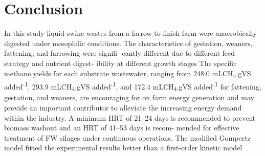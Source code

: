 \section{Conclusion}
In this study liquid swine wastes from a farrow to finish farm were anaerobically digested under mesophilic conditions. The characteristics of gestation, weaners, fattening, and farrowing were signifi-
cantly different due to different feed strategy and nutrient digest- ibility at different growth stages The specific methane yields for each substrate wastewater, ranging from 248.0 mLCH\textsubscript{4}.gVS added\textsuperscript{-1}, 293.9 mLCH\textsubscript{4}.gVS added\textsuperscript{-1}, and 172.4 mLCH\textsubscript{4}.gVS added\textsuperscript{-1} for fattening, gestation, and weaners, are encouraging for on farm energy generation and may provide an important contributor to alleviate the increasing energy demand within the industry. A minimum HRT of 21–24 days is recommended to prevent biomass washout and an HRT of 41–53 days is recom- mended for effective treatment of FW silages under continuous operations. The modified Gompertz model fitted the experimental results better than a first-order kinetic model